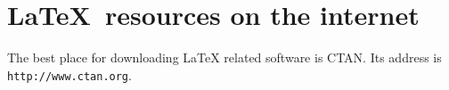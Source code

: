 \documentclass{article}
\begin{document}
\section{\textsf{\LaTeX\ resources on the internet}}

The best place for downloading LaTeX related software is CTAN.
Its address is \texttt{http://www.ctan.org}.
\end{document}
